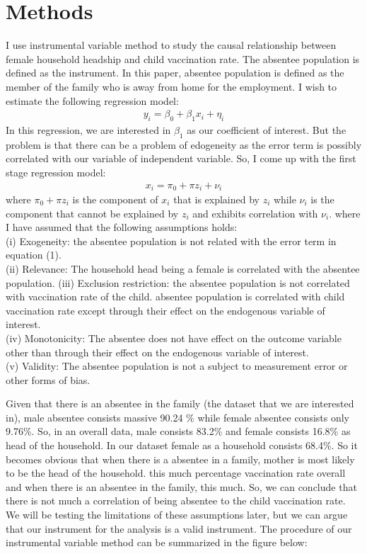 \documentclass[12pt]{article}
\begin{document}
\section{Methods}
I use instrumental variable method to study the causal relationship between female household headship and child vaccination rate. The absentee population is defined as the instrument. In this paper, absentee population is defined as the member of the family who is away from home for the employment. I wish to estimate the following regression model:
\begin{align}
    y_i = \beta_0 + \beta_1 x_i + \eta_i
\end{align}
In this regression, we are interested in $\beta_1$ as our coefficient of interest. But the problem is that there can be a problem of edogeneity as the error term is possibly correlated with our variable of independent variable. So, I come up with the first stage regression model:
\begin{align}
    x_i = \pi_0 + \pi z_i + \nu_i
\end{align}
where $\pi_0 + \pi z_i$ is the component of $x_i$ that is explained by $z_i$ while $\nu_i$ is the component that cannot be explained by $z_i$ and exhibits correlation with $\nu_i$.
where I have assumed that the following assumptions holds:\\
(i) Exogeneity: the absentee population is not related with the error term in equation (1).\\
(ii) Relevance: The household head being a female is correlated with the absentee population.
(iii) Exclusion restriction: the absentee population is not correlated with vaccination rate of the child. absentee population is correlated with child vaccination rate except through their effect on the endogenous variable of interest.\\
(iv) Monotonicity: The absentee does not have effect on the outcome variable other than through their effect on the endogenous variable of interest.\\
(v) Validity: The absentee population is not a subject to measurement error or other forms of bias.

Given that there is an absentee in the family (the dataset that we are interested in), male absentee consists massive 90.24 \% while female absentee consists only 9.76\%. So, in an overall data, male consists 83.2\% and female consists 16.8\% as head of the household. In our dataset female as a household consists 68.4\%. So it becomes obvious that when there is a absentee in a family, mother is most likely to be the head of the household. {this much percentage vaccination rate overall and when there is an absentee in the family, this much}. So, we can conclude that there is not much a correlation of being absentee to the child vaccination rate. We will be testing the limitations of these assumptions later, but we can argue that our instrument for the analysis is a valid instrument. The procedure of our instrumental variable method can be summarized in the figure below:
\end{document}
